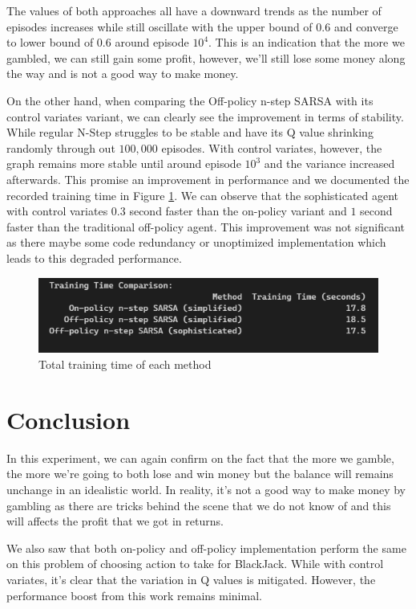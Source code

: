 \documentclass{article}
\begin{document}
The values of both approaches all have a downward trends as the number of
episodes increases while still oscillate with the upper bound of $0.6$ and
converge to lower bound of $0.6$ around episode $10^4$. 
This is an indication that the more we gambled, we can still gain some profit,
however, we'll still lose some money along the way and is not a good way to make
money.

On the other hand, when comparing the Off-policy n-step SARSA with its control variates
variant, we can clearly see the improvement in terms of stability. While regular
N-Step struggles to be stable and have its Q value shrinking randomly
through out $100,000$ episodes. With control variates, however, the graph remains more
stable until around episode $10^3$ and the variance increased afterwards. This
promise an improvement in performance and we documented
the recorded training time in Figure
\ref{fig:Figure5}. We can observe
that the sophisticated agent with control variates $0.3$ second faster than the
on-policy variant and $1$ second faster than the traditional off-policy agent.
This improvement was not significant as there maybe some code redundancy or
unoptimized implementation which leads to this degraded performance.

\begin{figure}[!ht]
	\centering
	\includegraphics[scale=0.50]{./images/Figure 5.png}
	\caption{Total training time of each method}
	\label{fig:Figure5}
\end{figure}

\section{Conclusion}
In this experiment, we can again confirm on the fact that the more we gamble,
the more we're going to both lose and win money but the balance will remains
unchange in an idealistic world. In reality, it's not a good way to make money
by gambling as there are tricks behind the scene that we do not know of and this
will affects the profit that we got in returns.

We also saw that both on-policy and off-policy implementation perform the same 
on this problem of choosing action to take for BlackJack. While with control 
variates, it's clear that the variation in Q values is mitigated. However, 
the performance boost from this work remains minimal.




\end{document}
